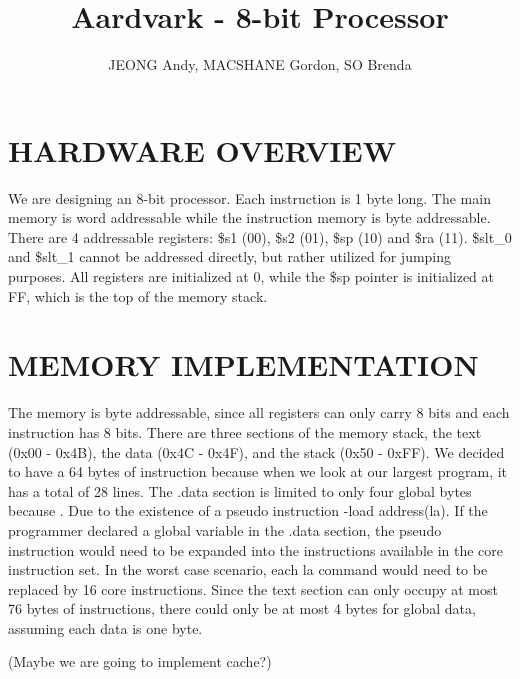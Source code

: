 \documentclass[11pt, titlepage]{article}
\author{JEONG Andy, MACSHANE Gordon, SO Brenda}
\title{Aardvark - 8-bit Processor}
\date{\parbox{\linewidth}{}}
\begin{document}
	\maketitle
    \tableofcontents
    \newpage
    \setcounter{tocdepth}{1}	
	\section{HARDWARE OVERVIEW}
    We are designing an 8-bit processor. Each instruction is 1 byte long. The main memory is word addressable while the instruction memory is byte addressable. There are 4 addressable registers: \$s1 (00), \$s2 (01), \$sp (10) and \$ra (11). \$slt\_0 and \$slt\_1 cannot be addressed directly, but rather utilized for jumping purposes. All registers are initialized at 0, while the \$sp pointer is initialized at FF, which is the top of the memory stack. 
    
    \section{MEMORY IMPLEMENTATION}
    The memory is byte addressable, since all registers can only carry 8 bits and each instruction has 8 bits. There are three sections of the memory stack, the text (0x00 - 0x4B), the data (0x4C - 0x4F), and the stack (0x50 - 0xFF). We decided to have a 64 bytes of instruction because when we look at our largest program, it has a total of 28 lines. The .data section is limited to only four global bytes because . Due to the existence of a pseudo instruction -load address(la). If the programmer declared a global variable in the .data section, the pseudo instruction would need to be expanded into the instructions available in the core instruction set. In the worst case scenario, each la command would need to be replaced by 16 core instructions. Since the text section can only occupy at most 76 bytes of instructions, there could only be at most 4 bytes for global data, assuming each data is one byte. 
    
    (Maybe we are going to implement cache?)
    
    \section{}
    
\end{document}

